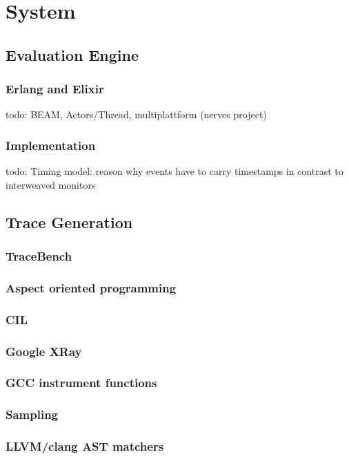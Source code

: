%
\chapter{System}
\label{sec:system}

\section{Evaluation Engine}
\label{sec:system:eval_engine}

\subsection{Erlang and Elixir}
\label{sec:system:eval_engine:erlang_elixir}
todo: BEAM, Actors/Thread, multiplattform (nerves project)

\subsection{Implementation}
todo: Timing model: reason why events have to carry timestamps in contrast to interweaved monitors

\section{Trace Generation}
\label{sec:system:traces}

\subsection{TraceBench}
\subsection{Aspect oriented programming}
\subsection{CIL}
\subsection{Google XRay}
\subsection{GCC instrument functions}
\subsection{Sampling}
\subsection{LLVM/clang AST matchers}
